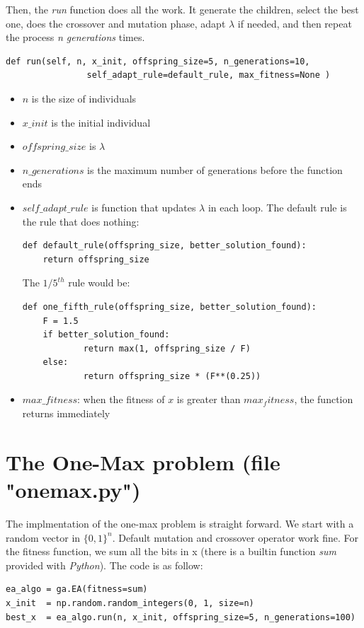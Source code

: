 \documentclass{article}
\begin{document}
Then, the \textit{run} function does all the work. It generate the children, select the best one, does the crossover and mutation phase, adapt $\lambda$ if needed, and then repeat the process \textit{n generations} times.  

\begin{verbatim}
def run(self, n, x_init, offspring_size=5, n_generations=10, 
				self_adapt_rule=default_rule, max_fitness=None )
\end{verbatim}

\begin{itemize}
	\item $n$ is the size of individuals
	\item $x\_init$ is the initial individual
	\item $offspring\_size$ is $\lambda$
	\item $n\_generations$ is the maximum number of generations before the function ends
	\item $self\_adapt\_rule$ is function that updates $\lambda$ in each loop. The default rule is the rule that does nothing:
\begin{verbatim}
def default_rule(offspring_size, better_solution_found):
	return offspring_size
\end{verbatim}
	The $1/5^{th}$ rule would be:
\begin{verbatim}
def one_fifth_rule(offspring_size, better_solution_found):
	F = 1.5
	if better_solution_found:
			return max(1, offspring_size / F)
	else:
			return offspring_size * (F**(0.25))
\end{verbatim}
	\item $max\_fitness$: when the fitness of $x$ is greater than $max_fitness$, the function returns immediately
\end{itemize}

\section{The One-Max problem  (file "onemax.py")}
The implmentation of the one-max problem is straight forward. 
We start with a random vector in $\{0, 1\}^n$. Default mutation and crossover operator work fine. 
For the fitness function, we sum all the bits in x (there is a builtin function \textit{sum} provided with \textit{Python}). The code is as follow:
\begin{verbatim}
ea_algo = ga.EA(fitness=sum)
x_init 	= np.random.random_integers(0, 1, size=n)
best_x 	= ea_algo.run(n, x_init, offspring_size=5, n_generations=100)
\end{verbatim}
\end{document}
